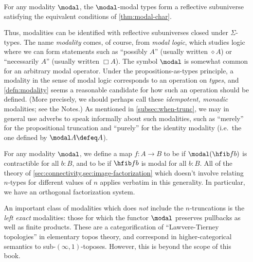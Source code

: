 \begin{cor}
  For any modality $\modal$, the $\modal$-modal types form a reflective subuniverse satisfying the equivalent conditions of \cref{thm:modal-char}.
\end{cor}

Thus, modalities can be identified with reflective subuniverses closed under $\Sigma$-types.
The name \emph{modality} comes, of course, from \emph{modal logic}, which studies logic where we can form statements such as ``possibly $A$'' (usually written $\diamond A$) or ``necessarily $A$'' (usually written $\Box A$).
The symbol $\modal$ is somewhat common for an arbitrary modal operator. %
Under the propositions-as-types principle, a modality in the sense of modal logic corresponds to an operation on \emph{types}, and \cref{defn:modality} seems a reasonable candidate for how such an operation should be defined.
(More precisely, we should perhaps call these \emph{idempotent, monadic} modalities; see the Notes.)
%
As mentioned in \cref{subsec:when-trunc}, we may in general use adverbs to speak informally about such modalities, such as ``merely'' for the propositional truncation and ``purely'' for the identity modality
%
%
(i.e.\ the one defined by $\modal A \defeq A$).

For any modality $\modal$, we define a map $f:A\to B$ to be 
%
%
if $\modal(\hfib f b)$ is contractible for all $b:B$, and to be 
%
%
if $\hfib f b$ is modal for all $b:B$.
All of the theory of \cref{sec:connectivity,sec:image-factorization} which doesn't involve relating $n$-types for different values of $n$ applies verbatim in this generality.
%
%
In particular, we have an orthogonal factorization system.

An important class of modalities which does \emph{not} include the $n$-trun\-ca\-tions is the \emph{left exact} modalities: those for which the functor $\modal$ preserves pullbacks as well as finite products.
%
These are a categorification of ``Lawvere-Tierney topologies'' in elementary topos theory,
and correspond in higher-categorical semantics to sub-$(\infty,1)$-toposes.
%
However, this is beyond the scope of this book.


